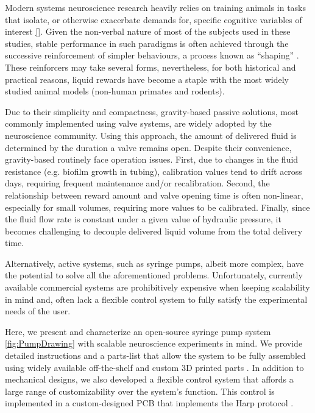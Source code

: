 Modern systems neuroscience research heavily relies on training animals in tasks that isolate, or otherwise exacerbate demands for, specific cognitive variables of interest \ref{}. Given the non-verbal nature of most of the subjects used in these studies, stable performance in such paradigms is often achieved through the successive reinforcement of simpler behaviours, a process known as “shaping” \citep{Jones1939}. These reinforcers may take several forms, nevertheless, for both historical and practical reasons, liquid rewards have become a staple with the most widely studied animal models (non-human primates and rodents)\citep{Guo2014}. 

Due to their simplicity and compactness, gravity-based passive solutions, most commonly implemented using valve systems, are widely adopted by the neuroscience community. Using this approach, the amount of delivered fluid is determined by the duration a valve remains open. Despite their convenience, gravity-based routinely face operation issues. First, due to changes in the fluid resistance (e.g. biofilm growth in tubing), calibration values tend to drift across days, requiring frequent maintenance and/or recalibration. Second, the relationship between reward amount and valve opening time is often non-linear, especially for small volumes, requiring more values to be calibrated. Finally, since the fluid flow rate is constant under a given value of hydraulic pressure, it becomes challenging to decouple delivered liquid volume from the total delivery time.

Alternatively, active systems, such as syringe pumps, albeit more complex, have the potential to solve all the aforementioned problems. Unfortunately, currently available commercial systems are prohibitively expensive when keeping scalability in mind and, often lack a flexible control system to fully satisfy the experimental needs of the user.

Here, we present and characterize an open-source syringe pump system \ref{fig:PumpDrawing} with scalable neuroscience experiments in mind. We provide detailed instructions and a parts-list that allow the system to be fully assembled using widely available off-the-shelf and custom 3D printed parts . 
In addition to mechanical designs, we also developed a flexible control system that affords a large range of customizability over the system's function. This control is implemented in a custom-designed PCB that implements the Harp protocol .

